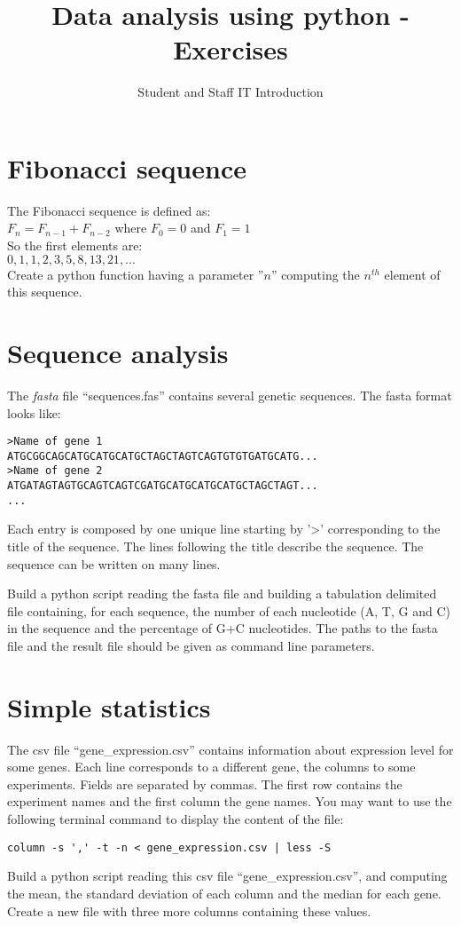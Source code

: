 \documentclass[article,10pt]{scrartcl}
\begin{document}
\title{Data analysis using python - Exercises}
\subtitle{Student and Staff IT Introduction}
\maketitle

\section{Fibonacci sequence}

The Fibonacci sequence is defined as:\\
$F_n = F_{n-1}+F_{n-2}$ where $F_0 = 0$ and $F_1 = 1$\\
So the first elements are:\\
$0,1,1,2,3,5,8,13,21,...$\\
Create a python function having a parameter ''$n$'' computing the $n^{th}$ element of this sequence.

\section{Sequence analysis}

The \emph{fasta} file ``sequences.fas'' contains several genetic sequences. The fasta format looks like:\\

\begin{lstlisting}
>Name of gene 1
ATGCGGCAGCATGCATGCATGCTAGCTAGTCAGTGTGTGATGCATG...
>Name of gene 2
ATGATAGTAGTGCAGTCAGTCGATGCATGCATGCATGCTAGCTAGT...
...
\end{lstlisting}

Each entry is composed by one unique line starting by '\textgreater' corresponding to the title of the sequence. The lines following the title describe the sequence. The sequence can be written on many lines.

Build a python script reading the fasta file and building a tabulation delimited file containing, for each sequence, the number of each nucleotide (A, T, G and C) in the sequence and the percentage of G+C nucleotides. The paths to the fasta file and the result file should be given as command line parameters.

\section{Simple statistics}

The csv file ``gene\_expression.csv'' contains information about expression level for some genes. Each line corresponds to a different gene, the columns to some experiments. Fields are separated by commas. The first row contains the experiment names and the first column the gene names. You may want to use the following terminal command to display the content of the file:
\begin{lstlisting}
column -s ',' -t -n < gene_expression.csv | less -S
\end{lstlisting}
Build a python script reading this csv file ``gene\_expression.csv'', and computing the mean, the standard deviation of each column and the median for each gene. Create a new file with three more columns containing these values.

\newpage

\end{document}
